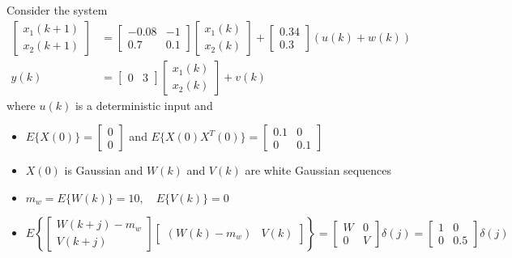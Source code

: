 \documentclass[letterpaper,12pt]{article}
\begin{document}
\begin{enumerate}
Consider the system
\begin{align*}
    \begin{bmatrix}
            x_1(k+1) \\
            x_2(k+1)
        \end{bmatrix} & = \begin{bmatrix}
            -0.08 & -1 \\
            0.7 & 0.1
        \end{bmatrix} \begin{bmatrix}
            x_1(k) \\
            x_2(k)
        \end{bmatrix} + \begin{bmatrix}
            0.34 \\
            0.3
        \end{bmatrix} (u(k) + w(k)) \\
    y(k) & = \begin{bmatrix}
            0 & 3
        \end{bmatrix} \begin{bmatrix}
            x_1(k) \\
            x_2(k)
        \end{bmatrix} + v(k)
\end{align*}
where $u(k)$ is a deterministic input and
\begin{itemize}
    \item
    $E \{ X(0) \} = \begin{bmatrix} 0 \\ 0 \end{bmatrix}$ and $E \{ X(0) X^T(0) \} = \begin{bmatrix} 0.1 & 0 \\ 0 & 0.1 \end{bmatrix}$

    \item
    $X(0)$ is Gaussian and $W(k)$ and $V(k)$ are white Gaussian sequences

    \item
    $m_{w} = E \{ W(k) \} = 10, \quad E \{ V(k) \} = 0$

    \item
    $E \left\{ \begin{bmatrix}
        W(k+j) - m_w  \\
        V(k+j)
    \end{bmatrix} \begin{bmatrix}
        (W(k) - m_w) &
        V(k)
    \end{bmatrix} \right\} = \begin{bmatrix}
        W & 0 \\
        0 & V
    \end{bmatrix} \delta(j) = \begin{bmatrix}
        1 & 0 \\
        0 & 0.5
    \end{bmatrix} \delta(j)$


\end{itemize}
\end{enumerate}
\end{document}
